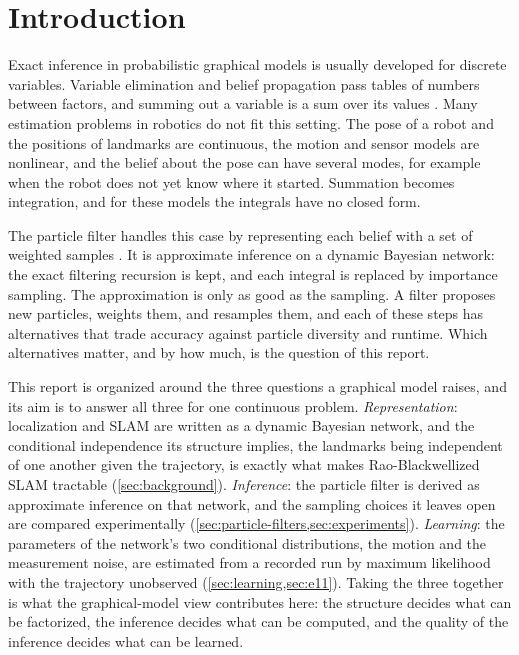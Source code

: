 \section{Introduction}\label{sec:introduction}

Exact inference in probabilistic graphical models is usually developed for discrete variables. Variable
elimination and belief propagation pass tables of numbers between factors, and summing out a variable is a sum
over its values \cite{koller2009probabilistic}. Many estimation problems in robotics do not fit this setting. The
pose of a robot and the positions of landmarks are continuous, the motion and sensor models are nonlinear, and the
belief about the pose can have several modes, for example when the robot does not yet know where it started.
Summation becomes integration, and for these models the integrals have no closed form.

The particle filter handles this case by representing each belief with a set of weighted samples
\cite{gordon1993novel,arulampalam2002tutorial}. It is approximate inference on a dynamic Bayesian network: the
exact filtering recursion is kept, and each integral is replaced by importance sampling. The approximation is only
as good as the sampling. A filter proposes new particles, weights them, and resamples them, and each of these
steps has alternatives that trade accuracy against particle diversity and runtime. Which alternatives matter,
and by how much, is the question of this report.

This report is organized around the three questions a graphical model raises, and its aim is to answer all three
for one continuous problem. \emph{Representation}: localization and SLAM are written as a dynamic Bayesian
network, and the conditional independence its structure implies, the landmarks being independent of one another
given the trajectory, is exactly what makes Rao-Blackwellized SLAM tractable (\cref{sec:background}).
\emph{Inference}: the particle filter is derived as approximate inference on that network, and the sampling
choices it leaves open are compared experimentally (\cref{sec:particle-filters,sec:experiments}).
\emph{Learning}: the parameters of the network's two conditional distributions, the motion and the measurement
noise, are estimated from a recorded run by maximum likelihood with the trajectory unobserved
(\cref{sec:learning,sec:e11}). Taking the three together is what the graphical-model view contributes here: the
structure decides what can be factorized, the inference decides what can be computed, and the quality of the
inference decides what can be learned.


